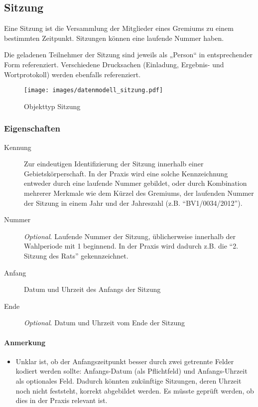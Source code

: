 \documentclass[,a4paper]{article}
\makeatletter
\def\maxwidth{\ifdim\Gin@nat@width>\linewidth\linewidth
\else\Gin@nat@width\fi}
\let\Oldincludegraphics\includegraphics
\renewcommand{\includegraphics}[1]{\Oldincludegraphics[width=\maxwidth]{#1}}
\makeatother
\begin{document}
\subsection{Sitzung}

Eine Sitzung ist die Versammlung der Mitglieder eines Gremiums zu einem
bestimmten Zeitpunkt. Sitzungen können eine laufende Nummer haben.

Die geladenen Teilnehmer der Sitzung sind jeweils als „Person`` in
entsprechender Form referenziert. Verschiedene Drucksachen (Einladung,
Ergebnis- und Wortprotokoll) werden ebenfalls referenziert.

\begin{figure}[htbp]
\centering
\texttt{[image: images/datenmodell\_sitzung.pdf]}
\caption{Objekttyp Sitzung}
\end{figure}

\subsubsection{Eigenschaften}

\begin{description}
\item[Kennung]
Zur eindeutigen Identifizierung der Sitzung innerhalb einer
Gebietskörperschaft. In der Praxis wird eine solche Kennzeichnung
entweder durch eine laufende Nummer gebildet, oder durch Kombination
mehrerer Merkmale wie dem Kürzel des Gremiums, der laufenden Nummer der
Sitzung in einem Jahr und der Jahreszahl (z.B. ``BV1/0034/2012'').
\item[Nummer]
\emph{Optional}. Laufende Nummer der Sitzung, üblicherweise innerhalb
der Wahlperiode mit 1 beginnend. In der Praxis wird dadurch z.B. die
``2. Sitzung des Rats'' gekennzeichnet.
\item[Anfang]
Datum und Uhrzeit des Anfangs der Sitzung
\item[Ende]
\emph{Optional}. Datum und Uhrzeit vom Ende der Sitzung
\end{description}

\paragraph{Anmerkung}

\begin{itemize}
\item
  Unklar ist, ob der Anfangszeitpunkt besser durch zwei getrennte Felder
  kodiert werden sollte: Anfangs-Datum (als Pflichtfeld) und
  Anfangs-Uhrzeit als optionales Feld. Dadurch könnten zukünftige
  Sitzungen, deren Uhrzeit noch nicht feststeht, korrekt abgebildet
  werden. Es müsste geprüft werden, ob dies in der Praxis relevant ist.
\end{itemize}
\end{document}
